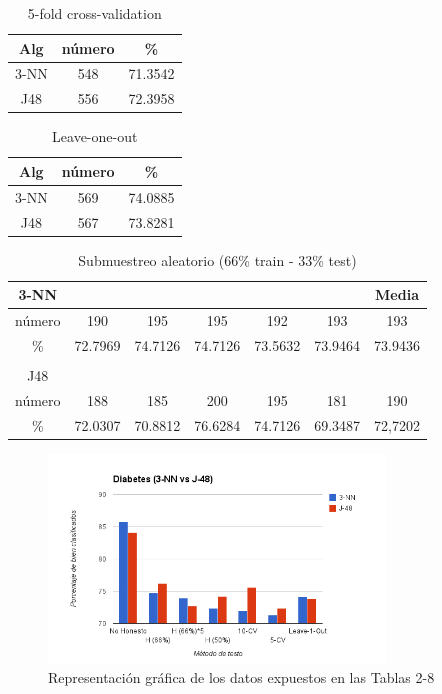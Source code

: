 \documentclass[es]{ifirak}
\begin{document}
\begin{table}[htbp]
\centering
\begin{tabular}{c|c|c}
Alg & número & \% \\
\hline
3-NN & 548 &  71.3542 \\
J48 & 556 & 72.3958 \\
\end{tabular}
\caption{5-fold cross-validation}\label{table}
\end{table}

\begin{table}[htbp]
\centering
\begin{tabular}{c|c|c}
Alg & número & \% \\
\hline
3-NN & 569 &  74.0885 \\
J48 & 567 & 73.8281 \\
\end{tabular}
\caption{Leave-one-out }\label{table}
\end{table}

\begin{table}[htbp]
\centering
\begin{tabular}{c|c|c|c|c|c|c}
3-NN&&&&&& Media \\
\hline
número & 190 		  & 195 		 & 195 		 & 192 		 & 193 		 & 193 		   \\
 \%    & 72.7969       & 74.7126 & 74.7126 & 73.5632 &73.9464 &73.9436\\
 &&&&&&\\
J48&&&&&&\\
\hline
 número & 188 		  & 185 		 & 200 		 & 195 		 & 181 		 & 190		   \\
 \%    & 72.0307       & 70.8812 & 76.6284 & 74.7126 &69.3487 &72,7202\\
\end{tabular}
\caption{Submuestreo aleatorio (66\% train - 33\% test) }\label{table}
\end{table}

\begin{figure}[htbp]
\centering
\includegraphics[width=0.8\textwidth]{2diabetes.png}
\caption{Representación gráfica de los datos expuestos en las Tablas 2-8}\label{figure}
\end{figure}
\end{document}

